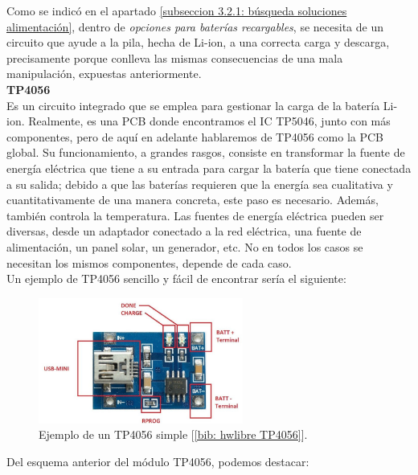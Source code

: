 \documentclass[12pt]{article}
\begin{document}
	\pagebreak
	
	\noindent Como se indicó en el apartado \ref{subseccion 3.2.1: búsqueda soluciones alimentación}, dentro de \textit{opciones para baterías recargables}, se necesita de un circuito que ayude a la pila, hecha de Li-ion, a una correcta carga y descarga, precisamente porque conlleva las mismas consecuencias de una mala manipulación, expuestas anteriormente. \\
		
	\noindent \textbf{TP4056} \\

	\noindent Es un circuito integrado que se emplea para gestionar la carga de la batería Li-ion.  Realmente, es una PCB donde encontramos el IC TP5046, junto con más componentes, pero de aquí en adelante hablaremos de TP4056 como la PCB global. Su funcionamiento, a grandes rasgos, consiste en transformar la fuente de energía eléctrica que tiene a su entrada para cargar la batería que tiene conectada a su salida; debido a que las baterías requieren que la energía sea cualitativa y cuantitativamente de una manera concreta, este paso es necesario. Además, también controla la temperatura. Las fuentes de energía eléctrica pueden ser diversas, desde un adaptador conectado a la red eléctrica, una fuente de alimentación, un panel solar, un generador, etc. No en todos los casos se necesitan los mismos componentes, depende de cada caso.\\
	
	\noindent Un ejemplo de TP4056 sencillo y fácil de encontrar sería el siguiente:  

	\begin{figure}[h]
		\begin{center}
			\includegraphics[width=0.6\textwidth]{img/tp4056_withoutBoost.png}
			\caption{Ejemplo de un TP4056 simple [\ref{bib: hwlibre TP4056}].}
			\label{TP4056 sin boost}
		\end{center}
	\end{figure}
	
	\noindent Del esquema anterior del módulo TP4056, podemos destacar: 
	
\end{document}
